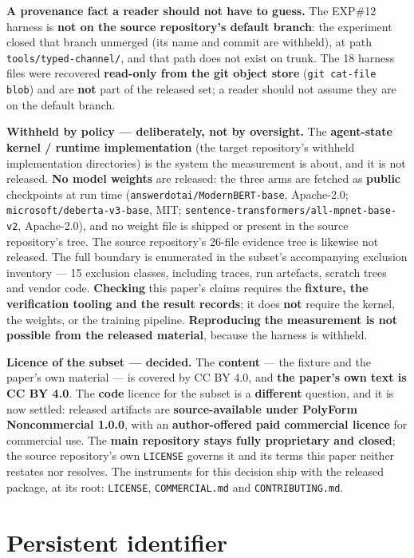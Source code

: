 \documentclass[11pt,a4paper]{article}
\begin{document}
\textbf{A provenance fact a reader should not have to guess.} The EXP\#12 harness is \textbf{not on the source repository's default branch}: the experiment closed that branch unmerged (its name and commit are withheld), at path \texttt{tools/typed-channel/}, and that path does not exist on trunk. The 18 harness files were recovered \textbf{read-only from the git object store} (\texttt{git cat-file blob}) and are \textbf{not} part of the released set; a reader should not assume they are on the default branch.

\textbf{Withheld by policy --- deliberately, not by oversight.} The \textbf{agent-state kernel / runtime implementation} (the target repository's withheld implementation directories) is the system the measurement is about, and it is not released. \textbf{No model weights} are released: the three arms are fetched as \textbf{public} checkpoints at run time (\texttt{answerdotai/ModernBERT-base}, Apache-2.0; \texttt{microsoft/deberta-v3-base}, MIT; \texttt{sentence-transformers/all-mpnet-base-v2}, Apache-2.0), and no weight file is shipped or present in the source repository's tree. The source repository's 26-file evidence tree is likewise not released. The full boundary is enumerated in the subset's accompanying exclusion inventory --- 15 exclusion classes, including traces, run artefacts, scratch trees and vendor code. \textbf{Checking} this paper's claims requires the \textbf{fixture, the verification tooling and the result records}; it does \textbf{not} require the kernel, the weights, or the training pipeline. \textbf{Reproducing the measurement is not possible from the released material}, because the harness is withheld.

\textbf{Licence of the subset --- decided.} The \textbf{content} --- the fixture and the paper's own material --- is covered by CC BY 4.0, and \textbf{the paper's own text is CC BY 4.0}. The \textbf{code} licence for the subset is a \textbf{different} question, and it is now settled: released artifacts are \textbf{source-available under PolyForm Noncommercial 1.0.0}, with an \textbf{author-offered paid commercial licence} for commercial use. The \textbf{main repository stays fully proprietary and closed}; the source repository's own \texttt{LICENSE} governs it and its terms this paper neither restates nor resolves. The instruments for this decision ship with the released package, at its root: \texttt{LICENSE}, \texttt{COMMERCIAL.md} and \texttt{CONTRIBUTING.md}.

\section*{Persistent identifier}
\end{document}
